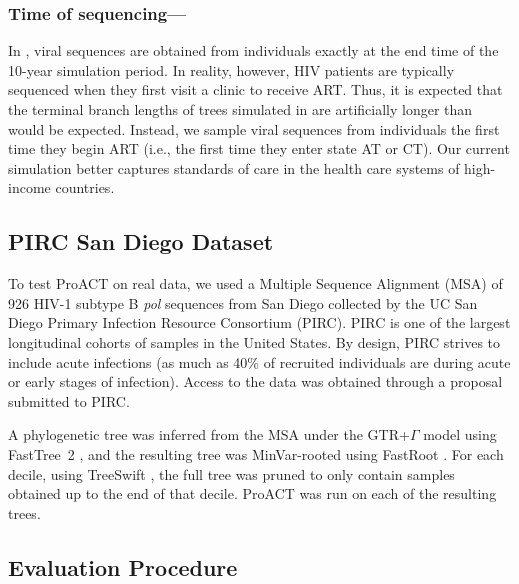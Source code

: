 \documentclass[oupdraft]{sysbio}
\newcommand{\PLWH}{sample\xspace}
\begin{document}
\subsubsection{Time of sequencing---} In \citet{Moshiri2018},
viral sequences are obtained from individuals exactly at the end time of the 10-year simulation period.
In reality, however,
HIV patients are typically sequenced when they first visit a clinic to receive ART.
Thus, it is expected that the terminal branch lengths of trees simulated in \citet{Moshiri2018} are artificially longer than would be expected.
Instead,
we sample viral sequences from individuals the first time they begin ART (i.e., the first time they enter state AT or CT).
Our current simulation better captures standards of care in the health care systems of high-income countries. 


\subsection{PIRC San Diego Dataset}
To test ProACT on real data, we used a Multiple Sequence Alignment (MSA) of 926 HIV-1 subtype B \textit{pol} sequences from San Diego collected by the UC San Diego Primary Infection Resource Consortium (PIRC). 
PIRC  is one of the largest longitudinal cohorts of \PLWH{s} in the United States. By design, PIRC strives to include acute infections (as much as 40\% of recruited individuals are during acute or early stages of infection).  
Access to the data was obtained through a proposal submitted to PIRC.

A phylogenetic tree was inferred from the MSA under the GTR+$\Gamma$ model using FastTree~2 \citep{Price2010}, and the resulting tree was MinVar-rooted using FastRoot \citep{Mai2017}. For each decile, using TreeSwift \citep{Moshiri2018b}, the full tree was pruned to only contain samples obtained up to the end of that decile. ProACT was run on each of the resulting trees.

\subsection{Evaluation Procedure}
\end{document}
